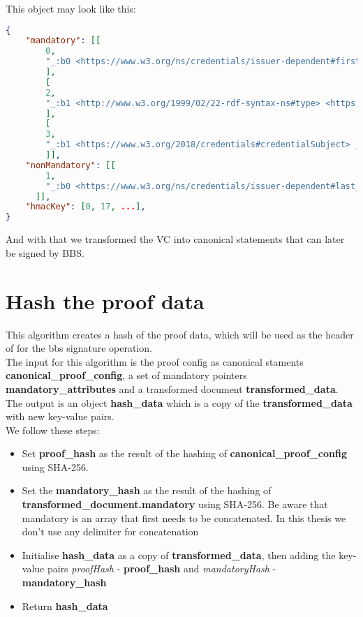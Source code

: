 \documentclass[
	a4paper               %
	,bibliography=totoc   %
	,listof=totoc         %
	,monolingual
]{bfhthesis}              %
\begin{document}
This object may look like this:

\begin{lstlisting}[language=json,firstnumber=1,caption={Return object of the VC transformation},captionpos=b]
{
	"mandatory": [[
		0,
		"_:b0 <https://www.w3.org/ns/credentials/issuer-dependent#first_name> \"Joel\" .\n",
		],
		[
		2,
		"_:b1 <http://www.w3.org/1999/02/22-rdf-syntax-ns#type> <https://www.w3.org/2018/credentials#VerifiableCredential> .\n",
		],
		[
		3,
		"_:b1 <https://www.w3.org/2018/credentials#credentialSubject> _:b0 .\n",
		]],
	"nonMandatory": [[
		1,
		"_:b0 <https://www.w3.org/ns/credentials/issuer-dependent#last_name> \"Robles\" .\n",
	  ]],
	"hmacKey": [0, 17, ...],
}
\end{lstlisting}

And with that we transformed the VC into canonical statements that can later be signed by BBS.

\section{Hash the proof data}
\label{subsubsec:proofHash}
This algorithm creates a hash of the proof data, which will be used as the header of for the bbs signature operation.\\

The input for this algorithm is the proof config as canonical staments \textbf{canonical\_proof\_config}, a set of mandatory pointers \textbf{mandatory\_attributes} and a transformed document \textbf{transformed\_data}.\\

The output is an object \textbf{hash\_data} which is a copy of the \textbf{transformed\_data} with new key-value pairs.\\

We follow these steps:
\begin{itemize}
	\item Set \textbf{proof\_hash} as the result of the hashing of \textbf{canonical\_proof\_config} using SHA-256.
	\item Set the \textbf{mandatory\_hash} as the result of the hashing of \textbf{transformed\_document.mandatory} using SHA-256. Be aware that mandatory is an array that first needs to be concatenated. In this thesis we don't use any delimiter for concatenation
	\item Initialise \textbf{hash\_data} as a copy of \textbf{transformed\_data}, then adding the key-value pairs \textit{proofHash} - \textbf{proof\_hash} and \textit{mandatoryHash} - \textbf{mandatory\_hash}
	\item Return \textbf{hash\_data}
\end{itemize}
\end{document}
